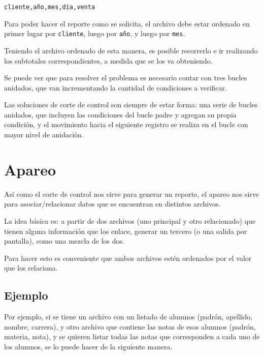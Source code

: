 \begin{verbatim}
cliente,año,mes,día,venta
\end{verbatim}

Para poder hacer el reporte como se solicita, el archivo debe estar ordenado en
primer lugar por \verb!cliente!, luego por \verb!año!, y luego por \verb!mes!.

Teniendo el archivo ordenado de esta manera, es posible recorrerlo e ir
realizando los subtotales correspondientes, a medida que se los va
obteniendo.



Se puede ver que para resolver el problema es necesario contar con tres
bucles anidados, que van incrementando la cantidad de condiciones a
verificar.

\begin{observacion}
Las soluciones de corte de control son siempre de estar forma: una serie de
bucles anidados, que incluyen las condiciones del bucle padre y agregan su
propia condición, y el movimiento hacia el siguiente registro se realiza en
el bucle con mayor nivel de anidación.
\end{observacion}

\section{Apareo}

Así como el corte de control nos sirve para generar un reporte, el apareo nos
sirve para asociar/relacionar datos que se encuentran en distintos archivos.

La idea básica es: a partir de dos archivos (uno principal y otro
relacionado) que tienen alguna información que los enlace, generar un
tercero (o una salida por pantalla), como una mezcla de los dos.

Para hacer esto es conveniente que ambos archivos estén ordenados por el valor
que los relaciona.

\subsection*{Ejemplo}

Por ejemplo, si se tiene un archivo con un listado de alumnos (padrón,
apellido, nombre, carrera), y otro archivo que contiene las notas de esos
alumnos (padrón, materia, nota), y se quieren listar todas las notas que
corresponden a cada uno de los alumnos, se lo puede hacer de la siguiente
manera.

